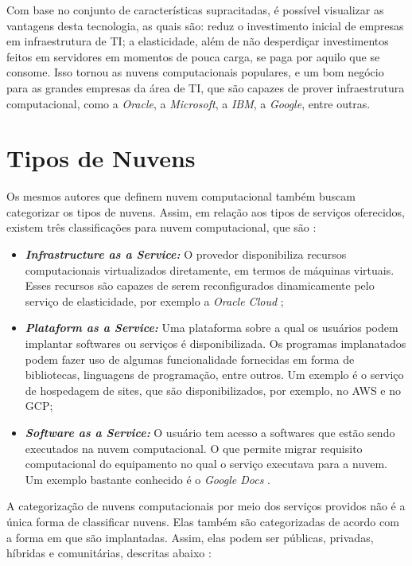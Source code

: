 Com base no conjunto de características supracitadas, é possível visualizar as vantagens desta tecnologia, as quais são: reduz o investimento inicial de empresas em infraestrutura de TI; a elasticidade, além de não desperdiçar investimentos feitos em servidores em momentos de pouca carga, se paga por aquilo que se consome. Isso tornou as nuvens computacionais populares, e um bom negócio para as grandes empresas da área de \acrfull{TI}, que são capazes de prover infraestrutura computacional, como a \textit{Oracle}, a \textit{Microsoft}, a \textit{IBM}, a \textit{Google}, entre outras.

\section{Tipos de Nuvens}

Os mesmos autores que definem nuvem computacional também buscam categorizar os tipos de nuvens. Assim, em relação aos tipos de serviços oferecidos, existem três classificações para nuvem computacional, que são \cite{NIST_CLOUD_DEFINITION} \cite{Vaquero:2008:BCT:1496091.1496100_Cloud_definition}:

\begin{itemize}
	\item \textbf{\textit{Infrastructure as a Service:}} O provedor disponibiliza recursos computacionais virtualizados diretamente, em termos de máquinas virtuais. Esses recursos são capazes de serem reconfigurados dinamicamente pelo serviço de elasticidade, por exemplo a \textit{Oracle Cloud} \cite{OracleCloud};
	\item \textbf{\textit{Plataform as a Service:}} Uma plataforma sobre a qual os usuários podem implantar softwares ou serviços é disponibilizada. Os programas implanatados podem fazer uso de algumas funcionalidade fornecidas em forma de bibliotecas, linguagens de programação, entre outros. Um exemplo é o serviço de hospedagem de sites, que são disponibilizados, por exemplo, no \acrfull{AWS}\cite{AWS_GPU} e no \acrfull{GCP}\cite{Google_Cloud_GPU};
	\item \textbf{\textit{Software as a Service:}} O usuário tem acesso a softwares que estão sendo executados na nuvem computacional. O que permite migrar requisito computacional do equipamento no qual o serviço executava para a nuvem. Um exemplo bastante conhecido é o \textit{Google Docs} \cite{GoogleDocs}.
\end{itemize}

A categorização de nuvens computacionais por meio dos serviços providos não é a única forma de classificar nuvens. Elas também são categorizadas de acordo com a forma em que são implantadas. Assim, elas podem ser públicas, privadas, híbridas e comunitárias, descritas abaixo \cite{NIST_CLOUD_DEFINITION}:

